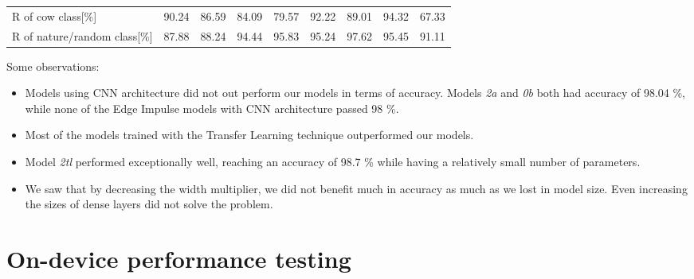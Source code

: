 \begin{table}[!htbp]
{\begin{tabular}{lrrrrrrrr}
        R of cow class[\%]              & \cellcolor{tbyellow} 90.24 
                                        & \cellcolor{tbyellow} 86.59 
                                        & \cellcolor{tbyellow} 84.09 
                                        & \cellcolor{tbyellow} 79.57 
                                        & \cellcolor{tbgreeny} 92.22 
                                        & \cellcolor{tbyellow} 89.01 
                                        & \cellcolor{tbgreen} 94.32 
                                        & \cellcolor{tbred} 67.33 \\
        R of nature/random class[\%]    & \cellcolor{tbyellow} 87.88 
                                        & \cellcolor{tbyellow} 88.24 
                                        & \cellcolor{tbyellow} 94.44 
                                        & \cellcolor{tbgreeny} 95.83 
                                        & \cellcolor{tbgreeny} 95.24 
                                        & \cellcolor{tbgreen} 97.62 
                                        & \cellcolor{tbgreeny} 95.45 
                                        & \cellcolor{tbyellow} 91.11 \\\bottomrule
    \end{tabular}}
    \label{precision_recall_table_ei}
\end{table}

Some observations:
\begin{itemize}
    \item Models using CNN architecture did not out perform our models in terms of accuracy. Models \textit{2a} and \textit{0b} both had accuracy of 98.04 \%, while none of the Edge Impulse models with CNN architecture passed 98 \%.
    \item Most of the models trained with the Transfer Learning technique outperformed our models.
    \item Model \textit{2tl} performed exceptionally well, reaching an accuracy of 98.7 \% while having a relatively small number of parameters.
    \item We saw that by decreasing the width multiplier, we did not benefit much in accuracy as much as we lost in model size. Even increasing the sizes of dense layers did not solve the problem. 
\end{itemize}


\section{ On-device performance testing}

